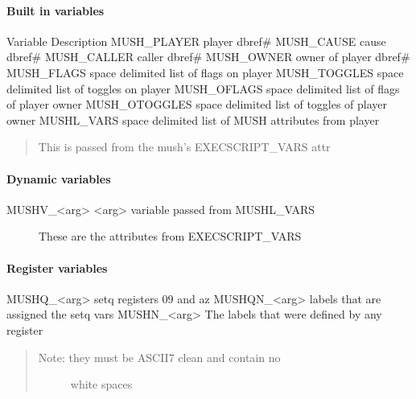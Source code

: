 \documentclass[letterpaper,10pt,english]{sphinxmanual}
\begin{document}
\paragraph{Built in variables}
\label{\detokenize{advanced:built-in-variables}}
\sphinxAtStartPar
Variable                   Description
MUSH\_PLAYER                player dbref\#
MUSH\_CAUSE                 cause dbref\#
MUSH\_CALLER                caller dbref\#
MUSH\_OWNER                 owner of player dbref\#
MUSH\_FLAGS                 space delimited list of flags on player
MUSH\_TOGGLES               space delimited list of toggles on player
MUSH\_OFLAGS                space delimited list of flags of player owner
MUSH\_OTOGGLES              space delimited list of toggles of player owner
MUSHL\_VARS                 space delimited list of MUSH attributes from player
\begin{quote}

\sphinxAtStartPar
This is passed from the mush’s EXECSCRIPT\_VARS attr
\end{quote}


\paragraph{Dynamic variables}
\label{\detokenize{advanced:dynamic-variables}}\begin{description}
\item[{MUSHV\_\textless{}arg\textgreater{}                \textless{}arg\textgreater{} variable passed from MUSHL\_VARS}] \leavevmode
\sphinxAtStartPar
These are the attributes from EXECSCRIPT\_VARS

\end{description}


\paragraph{Register variables}
\label{\detokenize{advanced:register-variables}}
\sphinxAtStartPar
MUSHQ\_\textless{}arg\textgreater{}                setq registers 0\sphinxhyphen{}9 and a\sphinxhyphen{}z
MUSHQN\_\textless{}arg\textgreater{}               labels that are assigned the setq vars
MUSHN\_\textless{}arg\textgreater{}                The labels that were defined by any register
\begin{quote}
\begin{description}
\item[{Note: they must be ASCII\sphinxhyphen{}7 clean and contain no}] \leavevmode
\sphinxAtStartPar
white spaces

\end{description}
\end{quote}
\end{document}
